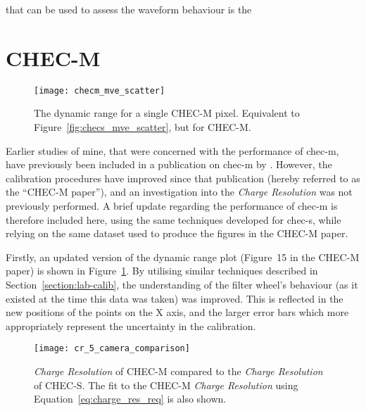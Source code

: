that can be used to assess the waveform behaviour is the 


\section{CHEC-M}

\begin{figure}
	\centering
    \texttt{[image: checm\_mve\_scatter]} 
	\caption[CHEC-M average measured charge versus average expected charge.]{The dynamic range for a single CHEC-M pixel. Equivalent to Figure~\ref{fig:checs_mve_scatter}, but for CHEC-M.}
	\label{fig:checm_mve_scatter}
\end{figure}

Earlier studies of mine, that were concerned with the performance of \gls{chec-m}, have previously been included in a publication on \gls{chec-m} by \textcite{Zorn2017}. However, the calibration procedures have improved since that publication (hereby referred to as the ``CHEC-M paper''), and an investigation into the \textit{Charge Resolution} was not previously performed. A brief update regarding the performance of \gls{chec-m} is therefore included here, using the same techniques developed for \gls{chec-s}, while relying on the same dataset used to produce the figures in the CHEC-M paper.

Firstly, an updated version of the dynamic range plot (Figure~15 in the \mbox{CHEC-M} paper) is shown in Figure~\ref{fig:checm_mve_scatter}. By utilising similar techniques described in Section~\ref{section:lab-calib}, the understanding of the filter wheel's behaviour (as it existed at the time this data was taken) was improved. This is reflected in the new positions of the points on the X axis, and the larger error bars which more appropriately represent the uncertainty in the calibration.

\begin{figure}
	\centering
    \texttt{[image: cr\_5\_camera\_comparison]} 
	\caption[\textit{Charge Resolution} of CHEC-M.]{\textit{Charge Resolution} of CHEC-M compared to the \textit{Charge Resolution} of CHEC-S. The fit to the CHEC-M \textit{Charge Resolution} using Equation~\ref{eq:charge_res_req} is also shown.}
	\label{fig:cr_5_camera_comparison}
\end{figure}

